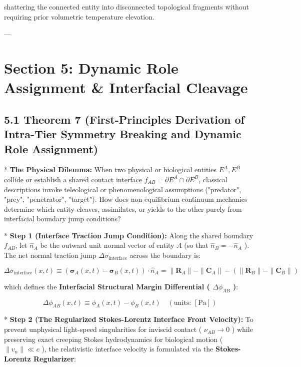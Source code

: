 \documentclass[11pt,a4paper]{article}
\theoremstyle{definition}
\theoremstyle{remark}
\begin{document}
shattering the connected entity into disconnected topological fragments without requiring prior volumetric temperature elevation.

---

\section{Section 5: Dynamic Role Assignment \& Interfacial Cleavage}

\subsection{5.1 Theorem 7 (First-Principles Derivation of Intra-Tier Symmetry Breaking and Dynamic Role Assignment)}
* \textbf{The Physical Dilemma:} When two physical or biological entities $E^A, E^B$ collide or establish a shared contact interface $f_{AB} = \partial E^A \cap \partial E^B$, classical descriptions invoke teleological or phenomenological assumptions ("predator", "prey", "penetrator", "target"). How does non-equilibrium continuum mechanics determine which entity cleaves, assimilates, or yields to the other purely from interfacial boundary jump conditions?

* \textbf{Step 1 (Interface Traction Jump Condition):}
Along the shared boundary $f_{AB}$, let $\hat{n}_A$ be the outward unit normal vector of entity $A$ (so that $\hat{n}_B = -\hat{n}_A$ ). The net normal traction jump $\Delta \sigma_{\text{interface}}$ across the boundary is:


\begin{equation}
\Delta \sigma_{\text{interface}}(x, t) \equiv \left( \boldsymbol{\sigma}_A(x, t) - \boldsymbol{\sigma}_B(x, t) \right) \cdot \hat{n}_A = \|\mathbf{R}_A\| - \|\mathbf{C}_A\| - \left( \|\mathbf{R}_B\| - \|\mathbf{C}_B\| \right)
\end{equation}


which defines the \textbf{Interfacial Structural Margin Differential ( $\Delta \phi_{AB}$ )}:


\begin{equation}
\boxed{\Delta \phi_{AB}(x, t) \equiv \phi_A(x, t) - \phi_B(x, t) \quad ( \text{units: } [\mathrm{Pa}] )}
\end{equation}


* \textbf{Step 2 (The Regularized Stokes-Lorentz Interface Front Velocity):}
To prevent unphysical light-speed singularities for inviscid contact ( $\nu_{AB} \to 0$ ) while preserving exact creeping Stokes hydrodynamics for biological motion ( $\|v_n\| \ll c$ ), the relativistic interface velocity is formulated via the \textbf{Stokes-Lorentz Regularizer}:
\end{document}
